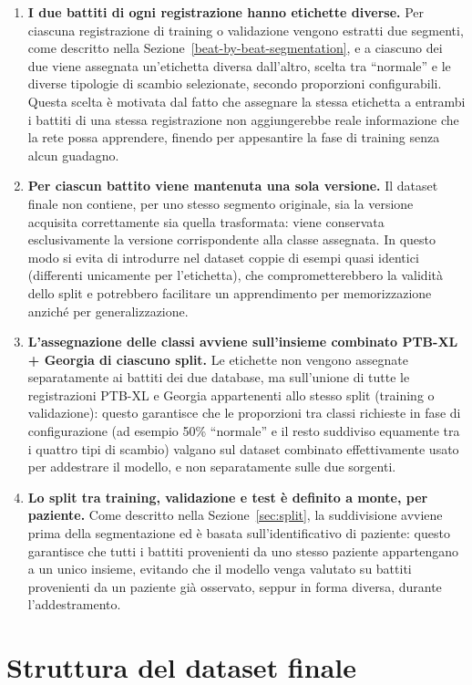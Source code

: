\begin{enumerate}
	\item \textbf{I due battiti di ogni registrazione hanno etichette diverse.} Per ciascuna registrazione di training o validazione vengono estratti due segmenti, come descritto nella Sezione~\ref{beat-by-beat-segmentation}, e a ciascuno dei due viene assegnata un'etichetta diversa dall'altro, scelta tra ``normale'' e le diverse tipologie di scambio selezionate, secondo proporzioni configurabili. Questa scelta è motivata dal fatto che assegnare la stessa etichetta a entrambi i battiti di una stessa registrazione non aggiungerebbe reale informazione che la rete possa apprendere, finendo per appesantire la fase di training senza alcun guadagno.
	\item \textbf{Per ciascun battito viene mantenuta una sola versione.} Il dataset finale non contiene, per uno stesso segmento originale, sia la versione acquisita correttamente sia quella trasformata: viene conservata esclusivamente la versione corrispondente alla classe assegnata. In questo modo si evita di introdurre nel dataset coppie di esempi quasi identici (differenti unicamente per l'etichetta), che comprometterebbero la validità dello split e potrebbero facilitare un apprendimento per memorizzazione anziché per generalizzazione.
	\item \textbf{L'assegnazione delle classi avviene sull'insieme combinato PTB-XL + Georgia di ciascuno split.} Le etichette non vengono assegnate separatamente ai battiti dei due database, ma sull'unione di tutte le registrazioni PTB-XL e Georgia appartenenti allo stesso split (training o validazione): questo garantisce che le proporzioni tra classi richieste in fase di configurazione (ad esempio 50\% ``normale'' e il resto suddiviso equamente tra i quattro tipi di scambio) valgano sul dataset combinato effettivamente usato per addestrare il modello, e non separatamente sulle due sorgenti.
	\item \textbf{Lo split tra training, validazione e test è definito a monte, per paziente.} Come descritto nella Sezione~\ref{sec:split}, la suddivisione avviene prima della segmentazione ed è basata sull'identificativo di paziente: questo garantisce che tutti i battiti provenienti da uno stesso paziente appartengano a un unico insieme, evitando che il modello venga valutato su battiti provenienti da un paziente già osservato, seppur in forma diversa, durante l'addestramento.
\end{enumerate}

\section{Struttura del dataset finale}
\label{sec:struttura_finale}

